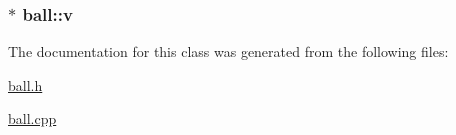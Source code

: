 \hypertarget{classball_a8adef25d2f27628485033939eae67eec}{
\subsubsection[{v}]{$\ast$ ball\-::v}}\label{classball_a8adef25d2f27628485033939eae67eec}


The documentation for this class was generated from the following files\-:\begin{DoxyCompactItemize}
\item 
\hyperlink{ball_8h}{ball.\-h}\item 
\hyperlink{ball_8cpp}{ball.\-cpp}\end{DoxyCompactItemize}
